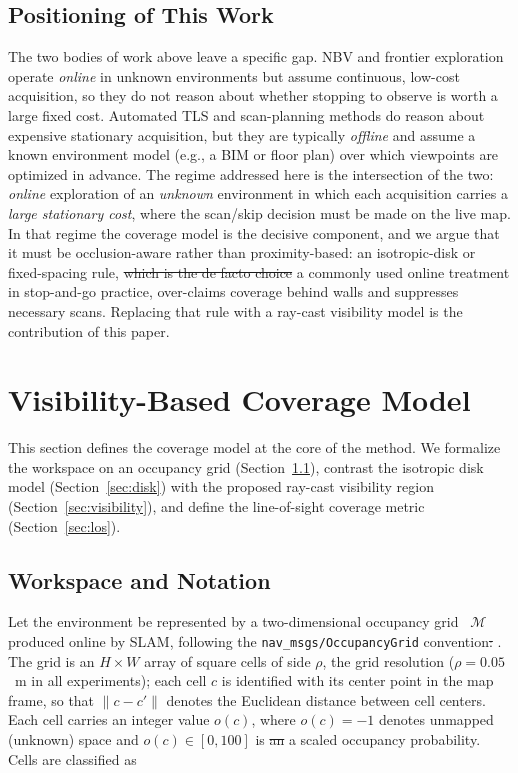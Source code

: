 \documentclass[sensors,article,submit,pdftex,moreauthors]{Definitions/mdpi}
\providecommand{\DIFadd}[1]{{\protect\color{blue} \sf #1}} %
\providecommand{\DIFdel}[1]{{\protect\color{red}\protect\scriptsize\protect\sout{#1}}} %
\providecommand{\DIFaddbegin}{} %
\providecommand{\DIFaddend}{} %
\providecommand{\DIFdelbegin}{} %
\providecommand{\DIFdelend}{} %
\begin{document}
\subsection{Positioning of This Work}

The two bodies of work above leave a specific gap. NBV and frontier exploration
operate \emph{online} in unknown environments but assume continuous,
low-cost acquisition, so they do not reason about whether stopping to observe is
worth a large fixed cost. Automated TLS and scan-planning methods do reason about
expensive stationary acquisition, but they are typically \emph{offline} and
assume a known environment model (e.g., a BIM or floor plan) over which viewpoints
are optimized in advance. The regime addressed here is the intersection of the
two: \emph{online} exploration of an \emph{unknown} environment in which each
acquisition carries a \emph{large stationary cost}, where the scan/skip decision
must be made on the live map. In that regime the coverage model is the decisive
component, and we argue that it must be occlusion-aware rather than
proximity-based: an isotropic-disk or fixed-spacing rule, \DIFdelbegin \DIFdel{which is the de facto
choice }\DIFdelend \DIFaddbegin \DIFadd{a commonly used
online treatment }\DIFaddend in stop-and-go practice, over-claims coverage behind walls and
suppresses necessary scans. Replacing that rule with a ray-cast visibility model is the
contribution of this paper.


\section{Visibility-Based Coverage Model}
\label{sec:coverage}

This section defines the coverage model at the core of the method. We formalize
the workspace on an occupancy grid (Section~\ref{sec:notation}), contrast the
isotropic disk model (Section~\ref{sec:disk}) with the proposed ray-cast
visibility region (Section~\ref{sec:visibility}), and define the line-of-sight
coverage metric (Section~\ref{sec:los}).

\subsection{Workspace and Notation}
\label{sec:notation}

Let the environment be \DIFaddbegin \DIFadd{represented by }\DIFaddend a two-dimensional occupancy
grid~\cite{elfes1989,thrun2005} $\mathcal{M}$ produced online by SLAM,
following the \texttt{nav\_msgs/OccupancyGrid}
convention\DIFdelbegin \DIFdel{: }\DIFdelend \DIFaddbegin \DIFadd{. The grid is an $H\times W$ array of square cells of side $\rho$,
the grid resolution ($\rho=0.05$~m in all experiments); }\DIFaddend each cell $c$ \DIFaddbegin \DIFadd{is
identified with its center point in the map frame, so that
$\lVert c-c'\rVert$ denotes the Euclidean distance between cell centers. Each
cell }\DIFaddend carries an integer value $o(c)$, where $o(c)=-1$ denotes unmapped
(unknown) space and $o(c)\in[0,100]$ is \DIFdelbegin \DIFdel{an }\DIFdelend \DIFaddbegin \DIFadd{a scaled }\DIFaddend occupancy probability. Cells
are classified as
\end{document}
